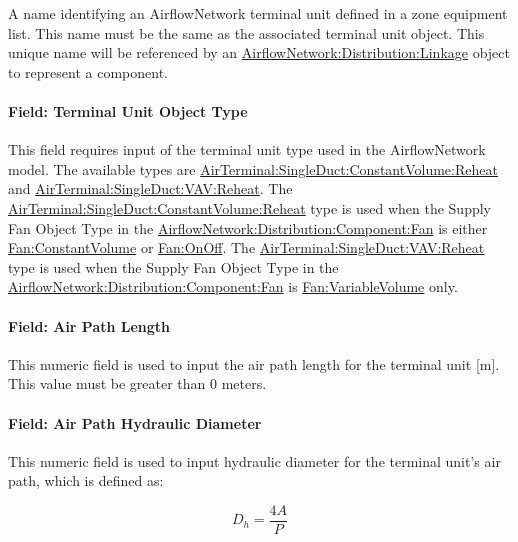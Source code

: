 A name identifying an AirflowNetwork terminal unit defined in a zone equipment list. This name must be the same as the associated terminal unit object. This unique name will be referenced by an \hyperref[airflownetworkdistributionlinkage]{AirflowNetwork:Distribution:Linkage} object to represent a component.

\paragraph{Field: Terminal Unit Object Type}\label{field-terminal-unit-object-type}

This field requires input of the terminal unit type used in the AirflowNetwork model. The available types are \hyperref[airterminalsingleductconstantvolumereheat]{AirTerminal:SingleDuct:ConstantVolume:Reheat} and \hyperref[airterminalsingleductvavreheat]{AirTerminal:SingleDuct:VAV:Reheat}. The \hyperref[airterminalsingleductconstantvolumereheat]{AirTerminal:SingleDuct:ConstantVolume:Reheat} type is used when the Supply Fan Object Type in the \hyperref[airflownetworkdistributioncomponentfan]{AirflowNetwork:Distribution:Component:Fan} is either \hyperref[fanconstantvolume]{Fan:ConstantVolume} or \hyperref[fanonoff]{Fan:OnOff}. The \hyperref[airterminalsingleductvavreheat]{AirTerminal:SingleDuct:VAV:Reheat} type is used when the Supply Fan Object Type in the \hyperref[airflownetworkdistributioncomponentfan]{AirflowNetwork:Distribution:Component:Fan} is \hyperref[fanvariablevolume]{Fan:VariableVolume} only.

\paragraph{Field: Air Path Length}\label{field-air-path-length-2}

This numeric field is used to input the air path length for the terminal unit {[}m{]}. This value must be greater than 0 meters.

\paragraph{Field: Air Path Hydraulic Diameter}\label{field-air-path-hydraulic-diameter-2}

This numeric field is used to input hydraulic diameter for the terminal unit's air path, which is defined as:

\begin{equation}
{D_h} = \frac{{4A}}{P}
\end{equation}

